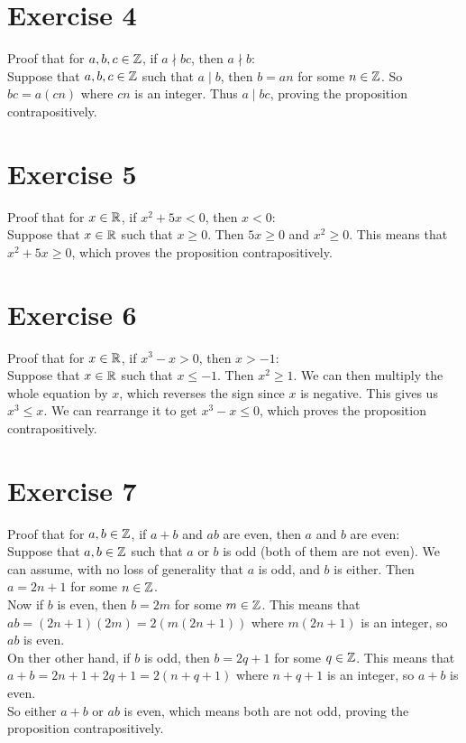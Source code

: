\documentclass[12pt]{article}
\begin{document}
    \section*{Exercise 4}
    Proof that for $a, b, c \in \mathbb{Z}$,
    if $a \nmid bc$,
    then $a \nmid b$: \\
    Suppose that $a, b, c \in \mathbb{Z}$
    such that $a \mid b$,
    then $b = an$ for some $n \in \mathbb{Z}$.
    So $bc = a(cn)$ where $cn$ is an integer.
    Thus $a \mid bc$,
    proving the proposition contrapositively. \\

    \section*{Exercise 5}
    Proof that for $x \in \mathbb{R}$,
    if $x^2 + 5x < 0$,
    then $x < 0$: \\
    Suppose that $x \in \mathbb{R}$
    such that $x \geqslant 0$.
    Then $5x \geqslant 0$ and $x^2 \geqslant 0$.
    This means that $x^2 + 5x \geqslant 0$,
    which proves the proposition contrapositively. \\

    \section*{Exercise 6}
    Proof that for $x \in \mathbb{R}$,
    if $x^3 - x > 0$,
    then $x > -1$: \\
    Suppose that $x \in \mathbb{R}$
    such that $x \leqslant -1$.
    Then $x^2\geqslant 1$.
    We can then multiply the whole equation by $x$,
    which reverses the sign since $x$ is negative.
    This gives us $x^3 \leqslant x$.
    We can rearrange it to get $x^3 - x \leqslant 0$,
    which proves the proposition contrapositively. \\

    \section*{Exercise 7}
    Proof that for $a, b \in \mathbb{Z}$,
    if $a + b$ and $ab$ are even,
    then $a$ and $b$ are even: \\
    Suppose that $a, b \in \mathbb{Z}$
    such that $a$ or $b$ is odd
    (both of them are not even).
    We can assume, with no loss of generality
    that $a$ is odd, and $b$ is either.
    Then $a = 2n+1$ for some $n \in \mathbb{Z}$. \\
    Now if $b$ is even,
    then $b = 2m$ for some $m \in \mathbb{Z}$. 
    This means that $ab = (2n+1)(2m) = 2(m(2n+1))$
    where $m(2n+1)$ is an integer,
    so $ab$ is even. \\
    On ther other hand, if $b$ is odd,
    then $b = 2q + 1$ for some $q \in \mathbb{Z}$. 
    This means that $a + b = 2n+1 + 2q+1 = 2(n + q + 1)$
    where $n + q + 1$ is an integer,
    so $a + b$ is even. \\
    So either $a+b$ or $ab$ is even,
    which means both are not odd,
    proving the proposition contrapositively. \\
\end{document}
